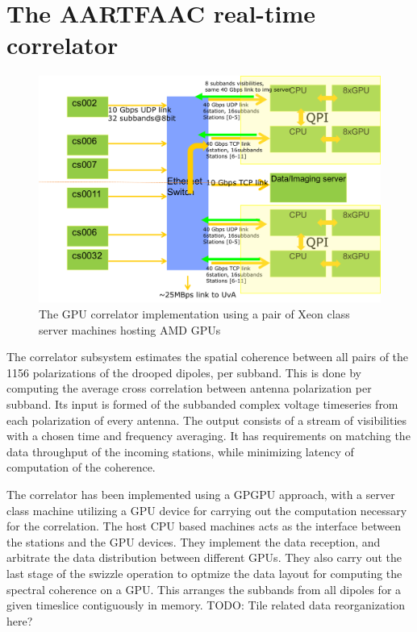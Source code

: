 \documentclass{aa}
\begin{document}
\section {\label{sec:gpucorr} The AARTFAAC real-time correlator}
\begin{figure}[htbp]
\centering
\includegraphics[width=1\textwidth]{Figs/correlator_arch.png}
\caption{The GPU  correlator implementation  using a pair  of Xeon  class server
  machines hosting AMD GPUs}
\label{fig:afaac_station_hw}
\end{figure}

The correlator  subsystem estimates the  spatial coherence between all  pairs of
the 1156  polarizations of the  drooped dipoles, per  subband.  This is  done by
computing  the  average  cross  correlation  between  antenna  polarization  per
subband. Its  input is formed of  the subbanded complex voltage  timeseries from
each  polarization  of every  antenna.   The  output  consists  of a  stream  of
visibilities with a chosen time and  frequency averaging. It has requirements on
matching the data throughput of  the incoming stations, while minimizing latency
of computation of the coherence.

The correlator has been implemented using  a GPGPU approach, with a server class
machine utilizing  a GPU device for  carrying out the computation  necessary for
the correlation.  The host CPU based  machines acts as the interface between the
stations and the  GPU devices. They implement the data  reception, and arbitrate
the data distribution between different GPUs. They also carry out the last stage
of the swizzle  operation to optmize the data layout  for computing the spectral
coherence on  a GPU.  This  arranges the subbands from  all dipoles for  a given
timeslice contiguously in memory. TODO: Tile related data reorganization here?\\
\end{document}
